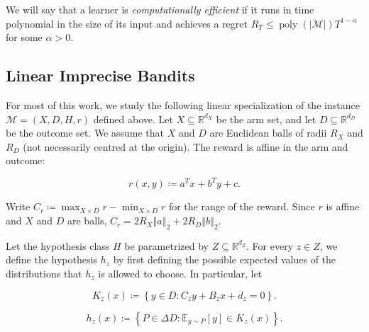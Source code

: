 We will say that a learner is \emph{computationally efficient} if it runs in time polynomial in the size of its input and achieves a regret $R_{T} \le \operatorname{poly} \left( | \mathcal{M} | \right) T^{1 - \alpha}$ for some $\alpha > 0$.


\subsection{Linear Imprecise Bandits}

For most of this work, we study the following linear specialization of the
instance $\mathcal{M} = \left( X , D , H , r \right)$ defined above. Let
$X \subseteq \mathbb{R}^{d_{X}}$ be the arm set, and let
$D \subseteq \mathbb{R}^{d_{D}}$ be the outcome set. We assume that $X$ and $D$ are
Euclidean balls of radii $R_{X}$ and $R_{D}$ (not necessarily centred at the origin).
The reward is affine in the arm and outcome:


\begin{equation*}
r \left( x , y \right) \coloneqq a^{T} x + b^{T} y + c .
\end{equation*}

{Write $C_{r} \coloneqq \operatorname*{max}_{X \times D} r - \operatorname*{min}_{X \times D} r$ for the range of the reward. Since $r$ is affine and $X$ and $D$ are balls, $C_{r} = 2 R_{X} {\left\Vert a \right\Vert}_{2} + 2 R_{D} {\left\Vert b \right\Vert}_{2}$.}

Let the hypothesis class $H$ be parametrized by $Z \subseteq \mathbb{R}^{d_{Z}}$.
For every $z \in Z$, we define the hypothesis $h_{z}$ by first defining the possible expected values of the distributions that $h_{z}$ is allowed to choose. In particular, let



\begin{equation}
K_{z} \left( x \right) \coloneqq \left\{ y \in D : C_{z} y + B_{z} x + d_{z} = 0 \right\} .\label{eq:setting-compatible-set}
\end{equation}


\begin{equation*}
h_{z} \left( x \right) \coloneqq \left\{ P \in \Delta D : \mathbb{E}_{y \sim P} \left[ y \right] \in K_{z} \left( x \right) \right\} .
\end{equation*}



